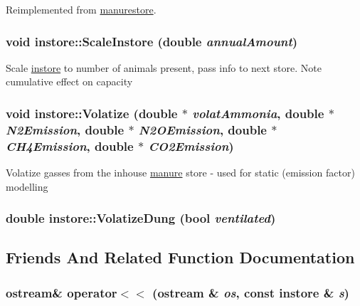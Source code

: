 Reimplemented from \hyperlink{classmanurestore_ae639f0ef3e9fee3416a2bfd2ab1ef496}{manurestore}.\hypertarget{classinstore_a589fc8cfe56114a2468991195f494d77}{
\subsubsection[{ScaleInstore}]{\setlength{\rightskip}{0pt plus 5cm}void instore::ScaleInstore (double {\em annualAmount})}}
\label{classinstore_a589fc8cfe56114a2468991195f494d77}
Scale \hyperlink{classinstore}{instore} to number of animals present, pass info to next store. Note cumulative effect on capacity \hypertarget{classinstore_ae11c6905a5d87e26fb8662e202faa188}{
\subsubsection[{Volatize}]{\setlength{\rightskip}{0pt plus 5cm}void instore::Volatize (double $\ast$ {\em volatAmmonia}, \/  double $\ast$ {\em N2Emission}, \/  double $\ast$ {\em N2OEmission}, \/  double $\ast$ {\em CH4Emission}, \/  double $\ast$ {\em CO2Emission})}}
\label{classinstore_ae11c6905a5d87e26fb8662e202faa188}
Volatize gasses from the inhouse \hyperlink{classmanure}{manure} store -\/ used for static (emission factor) modelling \hypertarget{classinstore_a6074de577169c2ad9bc7cb041c361771}{
\subsubsection[{VolatizeDung}]{\setlength{\rightskip}{0pt plus 5cm}double instore::VolatizeDung (bool {\em ventilated})}}
\label{classinstore_a6074de577169c2ad9bc7cb041c361771}


\subsection{Friends And Related Function Documentation}
\hypertarget{classinstore_a2ff66b6c5bc714a61ac6aeeebf9b2519}{
\subsubsection[{operator$<$$<$}]{\setlength{\rightskip}{0pt plus 5cm}ostream\& operator$<$$<$ (ostream \& {\em os}, \/  const {\bf instore} \& {\em s})}}
\label{classinstore_a2ff66b6c5bc714a61ac6aeeebf9b2519}


